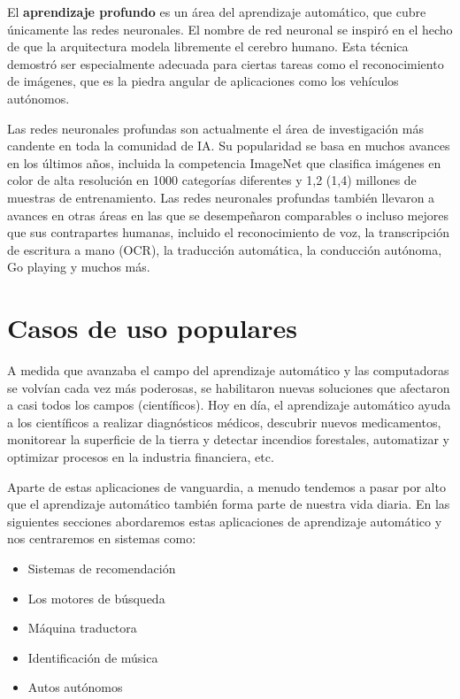 \documentclass[
]{book}
\providecommand{\tightlist}{%
  \setlength{\itemsep}{0pt}\setlength{\parskip}{0pt}}
\begin{document}
El \textbf{aprendizaje profundo} es un área del aprendizaje automático, que cubre únicamente las redes neuronales. El nombre de red neuronal se inspiró en el hecho de que la arquitectura modela libremente el cerebro humano. Esta técnica demostró ser especialmente adecuada para ciertas tareas como el reconocimiento de imágenes, que es la piedra angular de aplicaciones como los vehículos autónomos.

Las redes neuronales profundas son actualmente el área de investigación más candente en toda la comunidad de IA. Su popularidad se basa en muchos avances en los últimos años, incluida la competencia ImageNet que clasifica imágenes en color de alta resolución en 1000 categorías diferentes y 1,2 (1,4) millones de muestras de entrenamiento. Las redes neuronales profundas también llevaron a avances en otras áreas en las que se desempeñaron comparables o incluso mejores que sus contrapartes humanas, incluido el reconocimiento de voz, la transcripción de escritura a mano (OCR), la traducción automática, la conducción autónoma, Go playing y muchos más.

\hypertarget{casos-de-uso-populares}{%
\section{Casos de uso populares}\label{casos-de-uso-populares}}

A medida que avanzaba el campo del aprendizaje automático y las computadoras se volvían cada vez más poderosas, se habilitaron nuevas soluciones que afectaron a casi todos los campos (científicos). Hoy en día, el aprendizaje automático ayuda a los científicos a realizar diagnósticos médicos, descubrir nuevos medicamentos, monitorear la superficie de la tierra y detectar incendios forestales, automatizar y optimizar procesos en la industria financiera, etc.

Aparte de estas aplicaciones de vanguardia, a menudo tendemos a pasar por alto que el aprendizaje automático también forma parte de nuestra vida diaria. En las siguientes secciones abordaremos estas aplicaciones de aprendizaje automático y nos centraremos en sistemas como:

\begin{itemize}
\tightlist
\item
  Sistemas de recomendación
\item
  Los motores de búsqueda
\item
  Máquina traductora
\item
  Identificación de música
\item
  Autos autónomos
\end{itemize}
\end{document}
